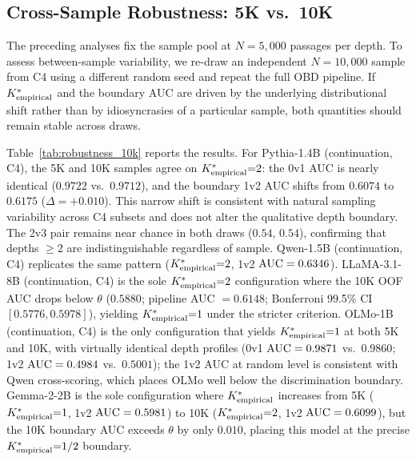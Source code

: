 \subsection{Cross-Sample Robustness: 5K vs.\ 10K}
\label{sec:robustness_10k}

The preceding analyses fix the sample pool at $N{=}5{,}000$ passages per depth.
To assess between-sample variability, we re-draw an independent $N{=}10{,}000$ sample from C4 using a different random seed and repeat the full OBD pipeline.
If ${K^*_{\text{empirical}}}$ and the boundary AUC are driven by the underlying distributional shift rather than by idiosyncrasies of a particular sample, both quantities should remain stable across draws.

Table~\ref{tab:robustness_10k} reports the results.
For Pythia-1.4B (continuation, C4), the 5K and 10K samples agree on ${K^*_{\text{empirical}}}{=}2$: the 0v1 AUC is nearly identical ($0.9722$ vs.\ $0.9712$), and the boundary 1v2 AUC shifts from $0.6074$ to $0.6175$ ($\Delta = +0.010$).
This narrow shift is consistent with natural sampling variability across C4 subsets and does not alter the qualitative depth boundary.
The 2v3 pair remains near chance in both draws ($0.54$, $0.54$), confirming that depths $\geq 2$ are indistinguishable regardless of sample.
Qwen-1.5B (continuation, C4) replicates the same pattern (${K^*_{\text{empirical}}}{=}2$, 1v2 $\text{AUC} = 0.6346$).
LLaMA-3.1-8B (continuation, C4) is the sole ${K^*_{\text{empirical}}}{=}2$ configuration where the 10K OOF AUC drops below $\theta$ ($0.5880$; pipeline AUC $= 0.6148$; Bonferroni 99.5\% CI $[0.5776, 0.5978]$), yielding ${K^*_{\text{empirical}}}{=}1$ under the stricter criterion.
OLMo-1B (continuation, C4) is the only configuration that yields ${K^*_{\text{empirical}}}{=}1$ at both 5K and 10K, with virtually identical depth profiles (0v1 $\text{AUC} = 0.9871$ vs.\ $0.9860$; 1v2 $\text{AUC} = 0.4984$ vs.\ $0.5001$); the 1v2 AUC at random level is consistent with Qwen cross-scoring, which places OLMo well below the discrimination boundary.
Gemma-2-2B is the sole configuration where ${K^*_{\text{empirical}}}$ increases from 5K (${K^*_{\text{empirical}}}{=}1$, 1v2 $\text{AUC} = 0.5981$) to 10K (${K^*_{\text{empirical}}}{=}2$, 1v2 $\text{AUC} = 0.6099$), but the 10K boundary AUC exceeds $\theta$ by only $0.010$, placing this model at the precise ${K^*_{\text{empirical}}}{=}1/2$ boundary.

